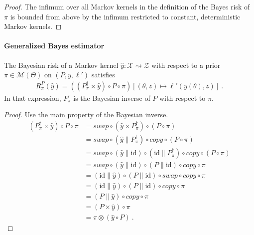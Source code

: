 \begin{proof}\leanok
\uses{}
The infimum over all Markov kernels in the definition of the Bayes risk of $\pi$ is bounded from above by the infimum restricted to constant, deterministic Markov kernels.
\end{proof}

\paragraph{Generalized Bayes estimator}

\begin{lemma}
  \label{lem:bayesianRisk_bayesInv}
  \leanok
  The Bayesian risk of a Markov kernel $\hat{y} : \mathcal X \rightsquigarrow \mathcal Z$ with respect to a prior $\pi \in \mathcal M(\Theta)$ on $(P, y, \ell')$ satisfies
  \begin{align*}
  R^P_\pi(\hat{y}) = ((P_\pi^\dagger \times \hat{y}) \circ P \circ \pi)\left[(\theta, z) \mapsto \ell'(y(\theta), z)\right] \: .
  \end{align*}
  In that expression, $P_\pi^\dagger$ is the Bayesian inverse of $P$ with respect to $\pi$.
\end{lemma}

\begin{proof}\leanok
\uses{}
Use the main property of the Bayesian inverse.
\begin{align*}
  (P_\pi^\dagger \times \hat{y}) \circ P \circ \pi
  &= swap \circ (\hat{y} \times P_\pi^\dagger) \circ (P \circ \pi)
  \\
  &= swap \circ (\hat{y} \parallel P_\pi^\dagger) \circ copy \circ (P \circ \pi)
  \\
  &= swap \circ (\hat{y} \parallel \mathrm{id}) \circ (\mathrm{id} \parallel P_\pi^\dagger) \circ copy \circ (P \circ \pi)
  \\
  &= swap \circ (\hat{y} \parallel \mathrm{id}) \circ (P \parallel \mathrm{id}) \circ copy \circ \pi
  \\
  &= (\mathrm{id} \parallel \hat{y}) \circ (P \parallel \mathrm{id}) \circ swap \circ copy \circ \pi
  \\
  &= (\mathrm{id} \parallel \hat{y}) \circ (P \parallel \mathrm{id}) \circ copy \circ \pi
  \\
  &= (P \parallel \hat{y}) \circ copy \circ \pi
  \\
  &= (P \times \hat{y}) \circ \pi
  \\
  &= \pi \otimes (\hat{y} \circ P)
  \: .
  \end{align*}
\end{proof}

